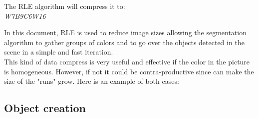The RLE algorithm will compress it to: \\
\textit{W7B9C6W16}

In this document, RLE is used to reduce image sizes allowing the segmentation algorithm to gather groups of colors and to go over the objects detected in the scene in a simple and fast iteration. \\

This kind of data compress is very useful and effective if the color in the picture is homogeneous. However, if not it could be contra-productive since can make the size of the "runs" grow. Here is an example of both cases: \\



\subsection{Object creation}
